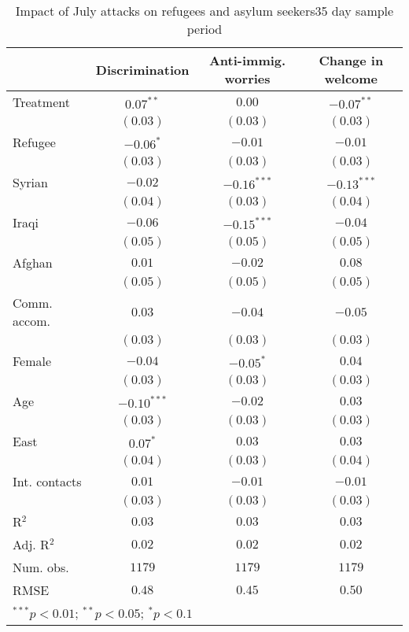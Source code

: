 
\begin{table}
\caption{Impact of July attacks on refugees and asylum seekers35 day sample period}
\begin{center}
\begin{tabular}{l c c c}
\toprule
 & Discrimination & Anti-immig. worries & Change in welcome \\
\midrule
Treatment     & $0.07^{**}$   & $0.00$        & $-0.07^{**}$  \\
              & $(0.03)$      & $(0.03)$      & $(0.03)$      \\
Refugee       & $-0.06^{*}$   & $-0.01$       & $-0.01$       \\
              & $(0.03)$      & $(0.03)$      & $(0.03)$      \\
Syrian        & $-0.02$       & $-0.16^{***}$ & $-0.13^{***}$ \\
              & $(0.04)$      & $(0.03)$      & $(0.04)$      \\
Iraqi         & $-0.06$       & $-0.15^{***}$ & $-0.04$       \\
              & $(0.05)$      & $(0.05)$      & $(0.05)$      \\
Afghan        & $0.01$        & $-0.02$       & $0.08$        \\
              & $(0.05)$      & $(0.05)$      & $(0.05)$      \\
Comm. accom.  & $0.03$        & $-0.04$       & $-0.05$       \\
              & $(0.03)$      & $(0.03)$      & $(0.03)$      \\
Female        & $-0.04$       & $-0.05^{*}$   & $0.04$        \\
              & $(0.03)$      & $(0.03)$      & $(0.03)$      \\
Age           & $-0.10^{***}$ & $-0.02$       & $0.03$        \\
              & $(0.03)$      & $(0.03)$      & $(0.03)$      \\
East          & $0.07^{*}$    & $0.03$        & $0.03$        \\
              & $(0.04)$      & $(0.03)$      & $(0.04)$      \\
Int. contacts & $0.01$        & $-0.01$       & $-0.01$       \\
              & $(0.03)$      & $(0.03)$      & $(0.03)$      \\
\midrule
R$^2$         & $0.03$        & $0.03$        & $0.03$        \\
Adj. R$^2$    & $0.02$        & $0.02$        & $0.02$        \\
Num. obs.     & $1179$        & $1179$        & $1179$        \\
RMSE          & $0.48$        & $0.45$        & $0.50$        \\
\bottomrule
\multicolumn{4}{l}{\scriptsize{$^{***}p<0.01$; $^{**}p<0.05$; $^{*}p<0.1$}}
\end{tabular}
\label{tab_host_z_mcs}
\end{center}
\end{table}
